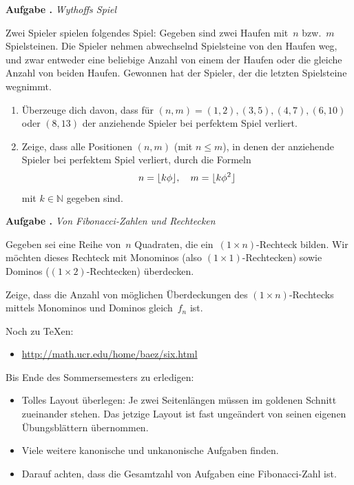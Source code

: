 \documentclass[a4paper,ngerman]{scrartcl}
\newlength{\aufgabenskip}
\newcounter{aufgabennummer}
\newenvironment{aufgabe}[1]{
  \addtocounter{aufgabennummer}{1}
  \textbf{Aufgabe \theaufgabennummer.} \emph{#1} \par
}{\vspace{\aufgabenskip}}
\newcommand{\NN}{\mathbb{N}}
\DeclarePairedDelimiter{\floor}{\lfloor}{\rfloor}
\begin{document}
\begin{aufgabe}{Wythoffs Spiel}
Zwei Spieler spielen folgendes Spiel: Gegeben sind zwei Haufen mit~$n$
bzw.~$m$ Spielsteinen. Die Spieler nehmen abwechselnd Spielsteine von
den Haufen weg, und zwar entweder eine beliebige Anzahl von einem der
Haufen oder die gleiche Anzahl von beiden Haufen. Gewonnen hat der
Spieler, der die letzten Spielsteine wegnimmt.
\begin{enumerate}
\item Überzeuge dich davon, dass für $(n,m) = (1,2),(3,5),(4,7),(6,10)$
oder $(8,13)$ der anziehende Spieler bei perfektem Spiel verliert.
\item Zeige, dass alle Positionen $(n,m)$ (mit $n\leq m$), in denen der
anziehende Spieler bei perfektem Spiel verliert, durch die Formeln
\[ n = \floor{k\phi}, \quad m = \floor{k\phi^2} \]
mit $k\in\NN$ gegeben sind.
\end{enumerate}
\end{aufgabe}

\begin{aufgabe}{Von Fibonacci-Zahlen und Rechtecken}
Gegeben sei eine Reihe von~$n$ Quadraten, die ein~$(1 \times n)$-Rechteck
bilden. Wir möchten dieses Rechteck mit Monominos (also
$(1 \times 1)$-Rechtecken) sowie Dominos ($(1\times 2)$-Rechtecken) überdecken.

Zeige, dass die Anzahl von möglichen Überdeckungen des $(1 \times n)$-Rechtecks
mittels Monominos und Dominos gleich~$f_n$ ist.
\end{aufgabe}

\vfill

Noch zu \TeX{}en:
\begin{itemize}
\item \url{http://math.ucr.edu/home/baez/six.html}
\end{itemize}

Bis Ende des Sommersemesters zu erledigen:
\begin{itemize}
\item Tolles Layout überlegen: Je zwei Seitenlängen müssen im goldenen Schnitt
zueinander stehen. Das jetzige Layout ist fast ungeändert von seinen eigenen
Übungsblättern übernommen.
\item Viele weitere kanonische und unkanonische Aufgaben finden.
\item Darauf achten, dass die Gesamtzahl von Aufgaben eine Fibonacci-Zahl ist.
\end{itemize}
\end{document}
